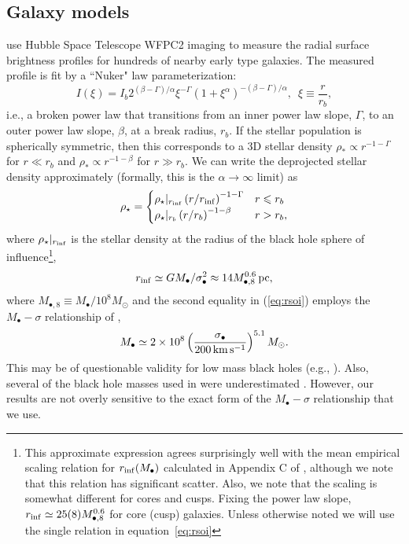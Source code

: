 \documentclass[usenatbib,fleqn]{mn2e}
\newcommand{\rb}{r_b}
\newcommand{\rhostar}{\rho_*}
\newcommand{\Mbh}[1][]{M_{\bullet#1}}
\newcommand{\Mbheight}{M_{\bullet,8}}
\newcommand{\rinf}{r_{\rm inf}}
\begin{document}
\subsection{Galaxy models}
\label{sec:gal_model}
\citet{LauerFaber+:2007a} use Hubble Space Telescope WFPC2 imaging to
measure the radial surface brightness profiles for hundreds of nearby
early type galaxies. The measured profile is fit by a ``Nuker" law parameterization:
\begin{equation}
  I(\xi)=I_b 2^{(\beta-\Gamma)/\alpha} \xi^{-\Gamma} (1+\xi^\alpha)^{-(\beta-\Gamma)/\alpha}, \,\,\,\xi\equiv\frac{r}{r_b},
\end{equation}
i.e., a broken power law that transitions from an inner power law
slope, $\Gamma$, to an outer power law slope, $\beta$, at a break
radius, $\rb$.  If the stellar population is spherically symmetric,
then this corresponds to a 3D stellar density $\rhostar \propto
r^{-1-\Gamma}$ for $r \ll \rb$ and $\rhostar\propto r^{-1-\beta}$ for
$r \gg \rb$.  We can write the deprojected stellar density
approximately (formally, this is the $\alpha \rightarrow \infty$
limit) as
\begin{align}
\rho_\star = 
\begin{cases}
\rho_\star|_{\rinf} \left(r/\rinf\right)^{-1-\Gamma} & r \leq r_b\\
\rho_\star|_{r_b} \left(r/r_b\right)^{-1-\beta} & r > r_b,
\label{eq:rhostar}
\end{cases}
\end{align}
where $\rho_\star|_{\rinf}$ is the stellar density at the radius of
the black hole sphere of influence\footnote{This approximate
  expression agrees surprisingly well with the mean empirical scaling
  relation for $r_{\rm inf}(M_\bullet)$ calculated in Appendix C of
  \citet{Stone&Metzger15}, although we note that this relation has
  significant scatter. Also, we note that the  scaling is somewhat
  different for cores and cusps. Fixing the power law slope,
  $\rinf\simeq 25 (8) \Mbheight^{0.6}$ for core (cusp)
  galaxies. Unless otherwise noted we will use the single relation in
  equation~\eqref{eq:rsoi}},
\begin{equation}
  \rinf \simeq G \Mbh/\sigma_{\bullet}^2 \approx 14 M_{\bullet,8}^{0.6}\,{\rm pc},
\label{eq:rsoi}
\end{equation}
where $M_{\bullet,8} \equiv M_{\bullet}/10^{8}M_{\odot}$ and the
second equality in (\ref{eq:rsoi}) employs the $\Mbh-\sigma$
relationship of \citet{McConnellMa+:2011a},
 \begin{align}
M_{\bullet} \simeq 2\times 10^{8}\left(\frac{\sigma_{\bullet}}{200\,{\rm
      km\,s^{-1}}}\right)^{5.1}M_{\odot}.
\label{eq:Msigma}
\end{align}
This may be of questionable validity for low mass black holes (e.g.,
\citealt{Greene+2010, Kormendy+2013}). Also, several of the black hole
masses used in \citealt{McConnellMa+:2011a} were underestimated
\citep{Kormendy+2013}. However, our results are not overly sensitive
to the exact form of the $\Mbh-\sigma$ relationship that we use.
\end{document}

